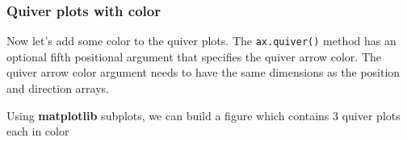 \documentclass{book}
\begin{document}
    
        \subsubsection{Quiver plots with color}\label{quiver-plots-with-color}

Now let's add some color to the quiver plots. The
\lstinline!ax.quiver()! method has an optional fifth positional argument
that specifies the quiver arrow color. The quiver arrow color argument
needs to have the same dimensions as the position and direction arrays.
    




    
        Using \textbf{matplotlib} subplots, we can build a figure which contains
3 quiver plots each in color
    
\end{document}
